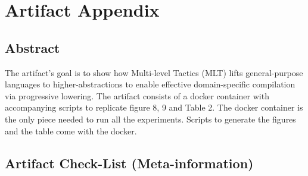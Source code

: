 %
%
%
%
%

\section*{Artifact Appendix}

\subsection{Abstract}

The artifact's goal is to show how Multi-level Tactics (MLT) lifts
general-purpose languages to higher-abstractions to enable effective
domain-specific compilation via progressive lowering. The artifact consists of
a docker container with accompanying scripts to replicate figure 8, 9 and Table
2. The docker container is the only piece needed to run all the experiments. Scripts
to generate the figures and the table come with the docker.

\subsection{Artifact Check-List (Meta-information)}


